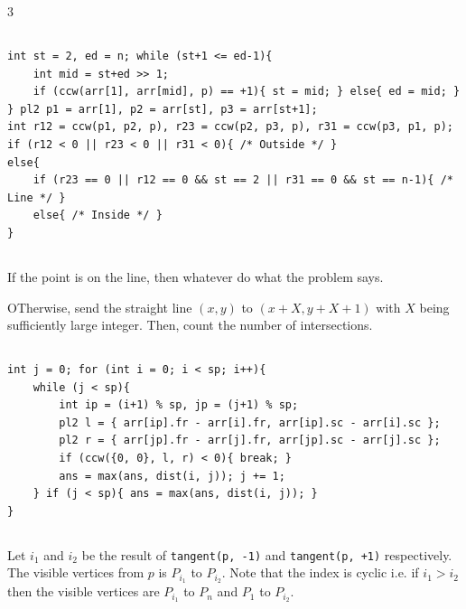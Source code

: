 \documentclass[landscape, 8pt, a4paper, oneside]{extarticle}
\begin{document}
\begin{multicols*}{3}
\subsection{}
\begin{verbatim}
int st = 2, ed = n; while (st+1 <= ed-1){
	int mid = st+ed >> 1;
	if (ccw(arr[1], arr[mid], p) == +1){ st = mid; } else{ ed = mid; }
} pl2 p1 = arr[1], p2 = arr[st], p3 = arr[st+1];
int r12 = ccw(p1, p2, p), r23 = ccw(p2, p3, p), r31 = ccw(p3, p1, p);
if (r12 < 0 || r23 < 0 || r31 < 0){ /* Outside */ }
else{
	if (r23 == 0 || r12 == 0 && st == 2 || r31 == 0 && st == n-1){ /* Line */ }
	else{ /* Inside */ }
}
\end{verbatim}
\subsection{}
If the point is on the line, then whatever do what the problem says.

OTherwise, send the straight line $(x, y)$ to $(x+X, y+X+1)$ with $X$ being sufficiently large integer. Then, count the number of intersections.
\subsection{}
\begin{verbatim}
int j = 0; for (int i = 0; i < sp; i++){
	while (j < sp){
		int ip = (i+1) % sp, jp = (j+1) % sp;
		pl2 l = { arr[ip].fr - arr[i].fr, arr[ip].sc - arr[i].sc };
		pl2 r = { arr[jp].fr - arr[j].fr, arr[jp].sc - arr[j].sc };
		if (ccw({0, 0}, l, r) < 0){ break; }
		ans = max(ans, dist(i, j)); j += 1;
	} if (j < sp){ ans = max(ans, dist(i, j)); }
}
\end{verbatim}
\subsection{}
Let $i_1$ and $i_2$ be the result of \texttt{tangent(p, -1)} and \texttt{tangent(p, +1)} respectively. The visible vertices from $p$ is $P_{i_1}$ to $P_{i_2}$.
Note that the index is cyclic i.e. if $i_1 > i_2$ then the visible vertices are $P_{i_1}$ to $P_n$ and $P_1$ to $P_{i_2}$.


\end{multicols*}
\end{document}
